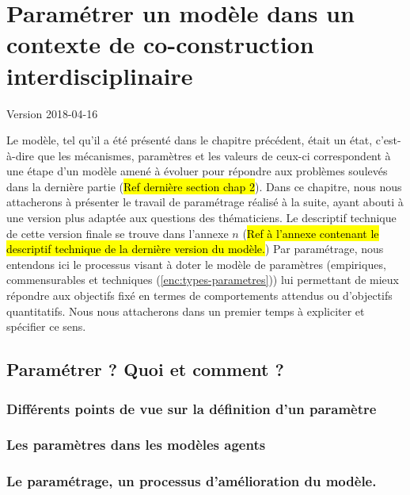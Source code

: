 \documentclass[12pt, a4paper, oneside]{book}
\begin{document}
	\setcounter{part}{0}
	\setcounter{chapter}{2}
	\setcounter{secnumdepth}{4}
		
	\chapter{Paramétrer un modèle dans un contexte de co-construction interdisciplinaire}
	\begin{center}
		{\large Version 2018-04-16}
	\end{center}

	Le modèle, tel qu'il a été présenté dans le chapitre précédent, était un \og état\fg{}, c'est-à-dire que les mécanismes, paramètres et les valeurs de ceux-ci correspondent à une étape d'un modèle amené à évoluer pour répondre aux problèmes soulevés dans la dernière partie (\hl{Ref dernière section chap 2}).
	Dans ce chapitre, nous nous attacherons à présenter le travail de paramétrage réalisé à la suite, ayant abouti à une version plus adaptée aux questions des thématiciens. Le descriptif technique de cette version \og finale\fg{} se trouve dans l'annexe $n$ (\hl{Ref à l'annexe contenant le descriptif technique de la dernière version du modèle.})
	Par paramétrage, nous entendons ici le processus visant à doter le modèle de paramètres (empiriques, \og commensurables\fg{} et techniques (\cref{enc:types-parametres})) lui permettant de mieux répondre aux objectifs fixé en termes de comportements attendus ou d'objectifs quantitatifs. Nous nous attacherons dans un premier temps à expliciter et spécifier ce sens.
	

%	
	\section{Paramétrer ? Quoi et comment ?}
	\subsection{Différents points de vue sur la définition d'un paramètre}
	\subsection{Les paramètres dans les modèles agents}
	\subsection{Le paramétrage, un processus d'amélioration du modèle.}
\end{document}
